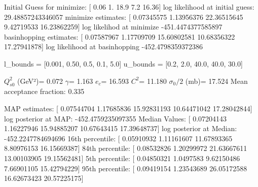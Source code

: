 \documentclass{article}
\begin{document}
Initial Guess for minimize:  [ 0.06  1.   18.9   7.2  16.36]
log likelihood at initial guess: 29.48857243346057
minimize estimates:  [ 0.07345575  1.13956376 22.36515645  9.42719533 16.23862259]
log likelihod at minimize -451.4474377585897
basinhopping estimates:  [ 0.07587967  1.17709709 15.60802581 10.68356322 17.27941878]
log likelihood at basinhopping -452.4798359372386

l_bounds = [0.001, 0.50, 0.5, 0.1, 5.0] 
u_bounds = [0.2, 2.0, 40.0, 40.0, 30.0]

$Q_{s0}^{2}$ (GeV²)= 0.072
$\gamma$= 1.163
$e_c$= 16.593
$C^{2}$= 11.180
$\sigma_0/2$ (mb)= 17.524
Mean acceptance fraction: 0.335

MAP estimates:  [ 0.07544704  1.17685836 15.92831193 10.64471042 17.28042844]
log posterior at MAP:  -452.4759235097355
Median Values:  [ 0.07204143  1.16227946 15.94885207 10.67643415 17.39648737]
log posterior at Median:  -452.2247784694696
16th percentile:  [ 0.05910932  1.11161607 11.67893365  8.80976153 16.15669387]
84th percentile:  [ 0.08532826  1.20299972 21.63667611 13.00103905 19.15562481]
5th percentile:  [ 0.04850321  1.0497583   9.62150486  7.66901105 15.42794229]
95th percentile:  [ 0.09419154  1.23543689 26.05172588 16.62673423 20.57225175]
\end{document}
